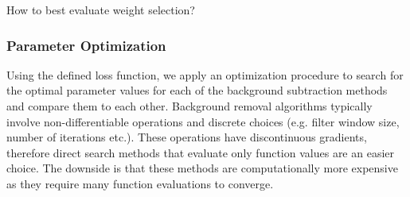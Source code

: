 \documentclass[iucr,review]{iucrjournals}
\begin{document}
\colorbox{SkyBlue!20}{How to best evaluate weight selection?}


%


\subsubsection{Parameter Optimization}

Using the defined loss function, we apply an optimization procedure to search for the optimal
parameter values for each of the background subtraction methods and compare them to each other.
Background removal algorithms typically involve non-differentiable operations
and discrete choices (e.g. filter window size, number of iterations etc.).
These operations have discontinuous gradients, therefore
direct search methods that evaluate only function values are an easier choice. 
The downside is that these methods are computationally more expensive
as they require many function evaluations to converge.
\end{document}
